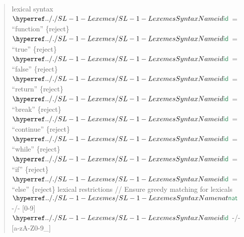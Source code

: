 \begin{quote}
lexical syntax\newline
$\SHADE{\SYNHYPER{../.}{SL-1-Lexemes}{id}}$ = {}``function{}'' \{reject\}\newline
$\SHADE{\SYNHYPER{../.}{SL-1-Lexemes}{id}}$ = {}``true{}''     \{reject\}\newline
$\SHADE{\SYNHYPER{../.}{SL-1-Lexemes}{id}}$ = {}``false{}''    \{reject\}\newline
$\SHADE{\SYNHYPER{../.}{SL-1-Lexemes}{id}}$ = {}``return{}''   \{reject\}\newline
$\SHADE{\SYNHYPER{../.}{SL-1-Lexemes}{id}}$ = {}``break{}''    \{reject\}\newline
$\SHADE{\SYNHYPER{../.}{SL-1-Lexemes}{id}}$ = {}``continue{}'' \{reject\}\newline
$\SHADE{\SYNHYPER{../.}{SL-1-Lexemes}{id}}$ = {}``while{}''    \{reject\}\newline
$\SHADE{\SYNHYPER{../.}{SL-1-Lexemes}{id}}$ = {}``if{}''       \{reject\}\newline
$\SHADE{\SYNHYPER{../.}{SL-1-Lexemes}{id}}$ = {}``else{}''     \{reject\}\newline
\newline
lexical restrictions\newline
// Ensure greedy matching for lexicals\newline
$\SHADE{\SYNHYPER{../.}{SL-1-Lexemes}{nat}}$ -/- {[}0-9{]}\newline
$\SHADE{\SYNHYPER{../.}{SL-1-Lexemes}{id}}$  -/- {[}a-zA-Z0-9\_{]}
\end{quote}

